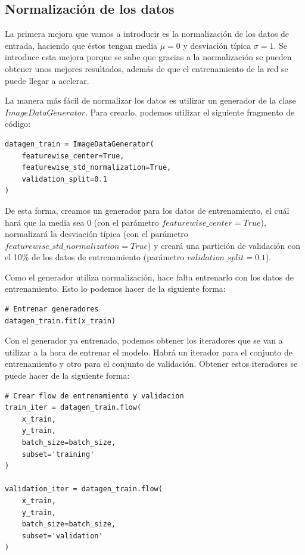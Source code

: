 \documentclass[11pt,a4paper]{article}
\begin{document}
\subsection{Normalización de los datos}

La primera mejora que vamos a introducir es la normalización de los datos de entrada, haciendo que éstos tengan media
$\mu = 0$ y desviación típica $\sigma = 1$. Se introduce esta mejora porque se sabe que gracias a la normalización se pueden
obtener unos mejores resultados, además de que el entrenamiento de la red se puede llegar a acelerar.

La manera más fácil de normalizar los datos es utilizar un generador de la clase $ImageDataGenerator$. Para crearlo, podemos
utilizar el siguiente fragmento de código:

\begin{lstlisting}
datagen_train = ImageDataGenerator(
    featurewise_center=True,
    featurewise_std_normalization=True,
    validation_split=0.1
)
\end{lstlisting}

De esta forma, creamos un generador para los datos de entrenamiento, el cuál hará que la media sea 0 (con el parámetro
$featurewise\_center = True$), normalizará la desviación típica (con el parámetro $featurewise\_std\_normalization = True$)
y creará una partición de validación con el 10\% de los datos de entrenamiento (parámetro $validation\_split = 0.1$).

Como el generador utiliza normalización, hace falta entrenarlo con los datos de entrenamiento. Esto lo podemos hacer
de la siguiente forma:

\begin{lstlisting}
# Entrenar generadores
datagen_train.fit(x_train)
\end{lstlisting}

Con el generador ya entrenado, podemos obtener los iteradores que se van a utilizar a la hora de entrenar el modelo. Habrá
un iterador para el conjunto de entrenamiento y otro para el conjunto de validación. Obtener estos iteradores se puede
hacer de la siguiente forma:

\begin{lstlisting}
# Crear flow de entrenamiento y validacion
train_iter = datagen_train.flow(
    x_train,
    y_train,
    batch_size=batch_size,
    subset='training'
)

validation_iter = datagen_train.flow(
    x_train,
    y_train,
    batch_size=batch_size,
    subset='validation'
)
\end{lstlisting}
\end{document}
